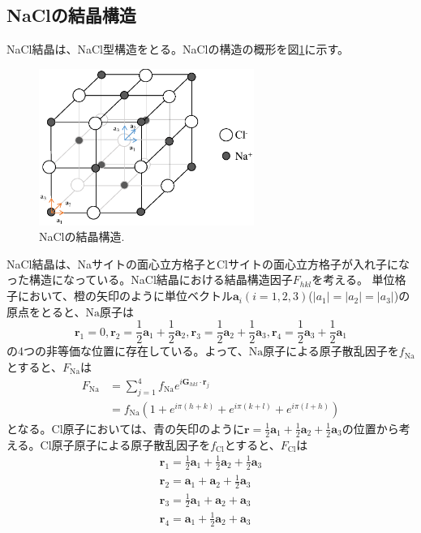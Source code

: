 \documentclass[11pt,a4j,uplatex]{jsarticle}
\begin{document}
\newpage
\subsection{NaClの結晶構造}
NaCl結晶は、NaCl型構造をとる。NaClの構造の概形を図\ref{nacl}に示す。

\begin{figure}[htb]
 \centering
 \includegraphics[clip,width=7cm]{nacl.eps}
 \caption{NaClの結晶構造.}
 \label{nacl}
\end{figure}

NaCl結晶は、Naサイトの面心立方格子とClサイトの面心立方格子が入れ子になった構造になっている。NaCl結晶における結晶構造因子$F_{hkl}$を考える。
単位格子において、橙の矢印のように単位ベクトル$\bm{a}_i(i=1,2,3)$($|a_1|=|a_2|=|a_3|$)の原点をとると、$\mathrm{Na}$原子は
\begin{equation}
 \bm{r}_1=0,\bm{r}_2=\frac{1}{2}\bm{a}_1+\frac{1}{2}\bm{a}_2,\bm{r}_3=\frac{1}{2}\bm{a}_2+\frac{1}{2}\bm{a}_3,\bm{r}_4=\frac{1}{2}\bm{a}_3+\frac{1}{2}\bm{a}_1
\end{equation}
の4つの非等価な位置に存在している。よって、$\mathrm{Na}$原子による原子散乱因子を$f_{\mathrm{Na}}$とすると、$F_{\mathrm{Na}}$は
\begin{equation}
 \begin{split}
  F_{\mathrm{Na}}&=\sum_{j=1}^4f_{\mathrm{Na}}e^{i\bm{G}_{hkl}\cdot\bm{r}_j}\\
  &=f_{\mathrm{Na}}(1+e^{i\pi(h+k)}+e^{i\pi(k+l)}+e^{i\pi(l+h)})
 \end{split}
\end{equation}
となる。$\mathrm{Cl}$原子においては、青の矢印のように$\bm{r}=\frac{1}{2}\bm{a}_1+\frac{1}{2}\bm{a}_2+\frac{1}{2}\bm{a}_3$の位置から考える。Cl原子原子による原子散乱因子を$f_{\mathrm{Cl}}$とすると、$F_{\mathrm{Cl}}$は
 \begin{equation}
  \begin{split}
   \bm{r}_1=\frac{1}{2}\bm{a}_1+\frac{1}{2}\bm{a}_2+\frac{1}{2}\bm{a}_3\\
   \bm{r}_2=\bm{a}_1+\bm{a}_2+\frac{1}{2}\bm{a}_3\\
   \bm{r}_3=\frac{1}{2}\bm{a}_1+\bm{a}_2+\bm{a}_3\\
   \bm{r}_4=\bm{a}_1+\frac{1}{2}\bm{a}_2+\bm{a}_3
  \end{split}
 \end{equation}
\fi
\end{document}
